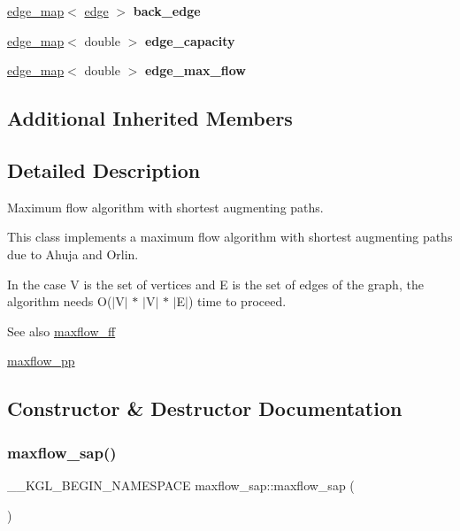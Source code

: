 \begin{DoxyCompactItemize}
\mbox{\hyperlink{classedge__map}{edge\+\_\+map}}$<$ \mbox{\hyperlink{classedge}{edge}} $>$ {\bfseries back\+\_\+edge}
\item 
\mbox{\label{classmaxflow__sap_acfa95eef5ea5bf7814c4dabd3994bc63}} 
\mbox{\hyperlink{classedge__map}{edge\+\_\+map}}$<$ double $>$ {\bfseries edge\+\_\+capacity}
\item 
\mbox{\label{classmaxflow__sap_a25820db833a98efc69fc3edb79fc49d3}} 
\mbox{\hyperlink{classedge__map}{edge\+\_\+map}}$<$ double $>$ {\bfseries edge\+\_\+max\+\_\+flow}
\end{DoxyCompactItemize}
\subsection*{Additional Inherited Members}


\subsection{Detailed Description}
Maximum flow algorithm with shortest augmenting paths. 

This class implements a maximum flow algorithm with shortest augmenting paths due to Ahuja and Orlin.

In the case V is the set of vertices and E is the set of edges of the graph, the algorithm needs O($\vert$\+V$\vert$ $\ast$ $\vert$\+V$\vert$ $\ast$ $\vert$\+E$\vert$) time to proceed.

\begin{DoxySeeAlso}{See also}
\mbox{\hyperlink{classmaxflow__ff}{maxflow\+\_\+ff}} 

\mbox{\hyperlink{classmaxflow__pp}{maxflow\+\_\+pp}} 
\end{DoxySeeAlso}


\subsection{Constructor \& Destructor Documentation}
\mbox{\label{classmaxflow__sap_affc6e05aaa6d1b1455c99d6b5595a838}} 
\subsubsection{\texorpdfstring{maxflow\+\_\+sap()}{maxflow\_sap()}}
{\footnotesize\ttfamily \+\_\+\+\_\+\+K\+G\+L\+\_\+\+B\+E\+G\+I\+N\+\_\+\+N\+A\+M\+E\+S\+P\+A\+CE maxflow\+\_\+sap\+::maxflow\+\_\+sap (\begin{DoxyParamCaption}{ }\end{DoxyParamCaption})}

